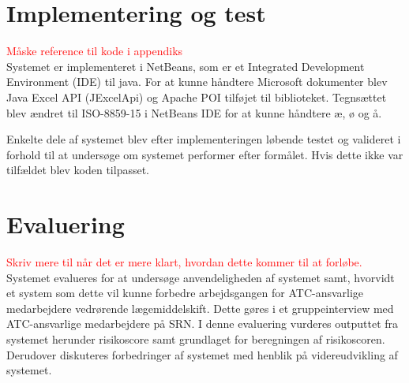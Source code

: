 \section{Implementering og test}
\textcolor{red}{Måske reference til kode i appendiks} \\
Systemet er implementeret i NetBeans, som er et Integrated Development Environment (IDE) til java. For at kunne håndtere Microsoft dokumenter blev Java Excel API (JExcelApi) og Apache POI tilføjet til biblioteket. Tegnsættet blev ændret til ISO-8859-15 i NetBeans IDE for at kunne håndtere æ, ø og å. 

Enkelte dele af systemet blev efter implementeringen løbende testet og valideret i forhold til at undersøge om systemet performer efter formålet. Hvis dette ikke var tilfældet blev koden tilpasset.

\section{Evaluering}
\textcolor{red}{Skriv mere til når det er mere klart, hvordan dette kommer til at forløbe.} \\
Systemet evalueres for at undersøge anvendeligheden af systemet samt, hvorvidt et system som dette vil kunne forbedre arbejdsgangen for ATC-ansvarlige medarbejdere vedrørende lægemiddelskift. Dette gøres i et gruppeinterview med ATC-ansvarlige medarbejdere på SRN. I denne evaluering vurderes outputtet fra systemet herunder risikoscore samt grundlaget for beregningen af risikoscoren. 
Derudover diskuteres forbedringer af systemet med henblik på videreudvikling af systemet.




